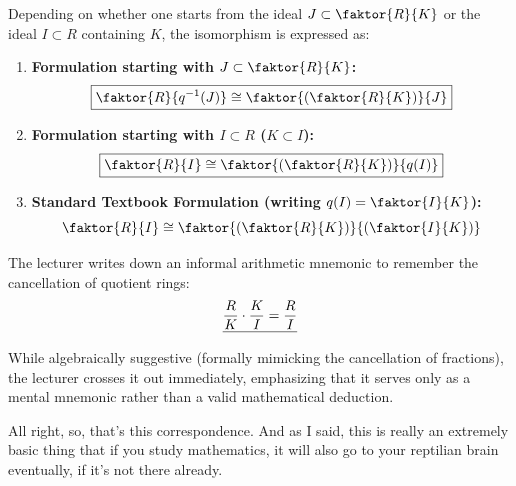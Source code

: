 \begin{content}

\begin{steps}
Depending on whether one starts from the ideal $J \subset \faktor{R}{K}$ or the ideal $I \subset R$ containing $K$, the isomorphism is expressed as:
\begin{enumerate}[label=\textbf{(\arabic*)}]
    \setcounter{enumi}{0} \item \textbf{Formulation starting with $J \subset \faktor{R}{K}$:}
    \[
    \boxed{\faktor{R}{q^{-1}(J)} \cong \faktor{\left(\faktor{R}{K}\right)}{J}}
    \]
    \setcounter{enumi}{1} \item \textbf{Formulation starting with $I \subset R$ ($K \subset I$):}
    \[
    \boxed{\faktor{R}{I} \cong \faktor{\left(\faktor{R}{K}\right)}{q(I)}}
    \]
    \setcounter{enumi}{2} \item \textbf{Standard Textbook Formulation (writing $q(I) = \faktor{I}{K}$):}
    \[
    \faktor{R}{I} \cong \faktor{\left(\faktor{R}{K}\right)}{\left(\faktor{I}{K}\right)}
    \]
\end{enumerate}
\end{steps}
\end{content}

\begin{overview}
The lecturer writes down an informal arithmetic mnemonic to remember the cancellation of quotient rings:
\[
\sout{\frac{R}{K} \cdot \frac{K}{I} = \frac{R}{I}}
\]
While algebraically suggestive (formally mimicking the cancellation of fractions), the lecturer crosses it out immediately, emphasizing that it serves only as a mental mnemonic rather than a valid mathematical deduction.
\end{overview}

\begin{speech}[00:09:12 - 00:09:28]
All right, so, that's this correspondence. And as I said, this is really an extremely basic thing that if you study mathematics, it will also go to your reptilian brain eventually, if it's not there already. 
\end{speech}

